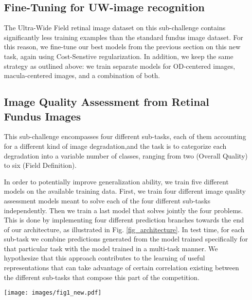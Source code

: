 \subsection{Fine-Tuning for UW-image recognition}
The Ultra-Wide Field retinal image dataset on this sub-challenge contains significantly less training examples than the standard fundus image dataset.
For this reason, we fine-tune our best models from the previous section on this new task, again using Cost-Senstive regularization.
In addition, we keep the same strategy as outlined above: we train separate models for OD-centered images, macula-centered  images, and a combination of both.

\subsection{Image Quality Assessment from Retinal Fundus Images}
This sub-challenge encompasses four different sub-tasks, each of them accounting for a different kind of image degradation,and the task is to categorize each degradation into a variable number of classes, ranging from two (Overall Quality) to six (Field Definition). 

In order to potentially improve generalization ability, we train five different models on the available training data. 
First, we train four different image quality assessment models meant to solve each of the four different sub-tasks independently. 
Then we train a last model that solves jointly the four problems. This is done by implementing four different prediction branches towards the end of our architecture, as illustrated in Fig. \ref{fig_architecture}.
In test time, for each sub-task we combine predictions generated from the model trained specifically for that particular task with the model trained in a multi-task manner.
We hypothesize that this approach contributes to the learning of useful representations that can take advantage of certain correlation existing between the different sub-tasks that compose this part of the competition.

\begin{figure*}[h]
\centering
\texttt{[image: images/fig1\_new.pdf]}
\caption{Our multi-task architecture, generating simultaneously predictions for all four sub-tasks in sub-challenge 2.}
\label{fig_architecture}
\end{figure*}

